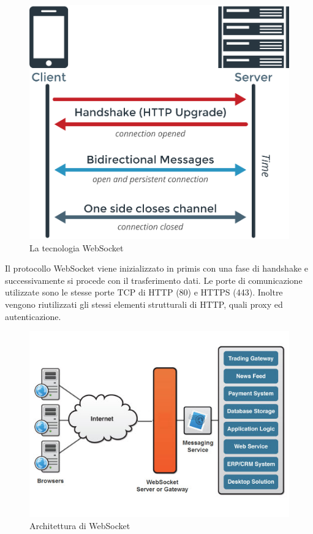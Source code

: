 \documentclass[12pt]{article}
\begin{document}
\begin{figure}[H]
	\centering
	\includegraphics[scale=0.25]{images/websocket.png}
	\caption{La tecnologia WebSocket}
	\label{websocket}
\end{figure}

Il protocollo WebSocket viene inizializzato in primis con una fase di handshake e successivamente si procede con il trasferimento dati. Le porte di comunicazione utilizzate sono le stesse porte TCP di HTTP (80) e HTTPS (443). Inoltre vengono riutilizzati gli stessi elementi strutturali di HTTP, quali proxy ed autenticazione.

\begin{figure}[H]
	\centering
	\includegraphics[scale=1.00]{images/websocket-architecture.jpg}
	\caption{Architettura di WebSocket}
	\label{websocket-architecture}
\end{figure}
\end{document}
